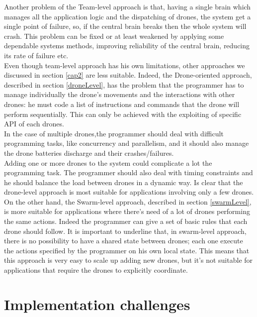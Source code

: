 Another problem of the Team-level approach is that, having a single brain which manages all the application logic and the dispatching of drones, the system get a single point of failure, so, if the central brain breaks then the whole system will crash.
This problem can be fixed or at least weakened by applying some dependable systems methods, improving reliability of the central brain, reducing its rate of failure etc.
\\

Even though team-level approach has his own limitations, other approaches we discussed in section \ref{cap2} are less suitable.
Indeed, the Drone-oriented approach, described in section \ref{droneLevel}, has the problem that the programmer has to manage individually the drone's movements and the interactions with other drones: he must code a list of instructions and commands that the drone will perform sequentially. This can only be achieved with the exploiting of specific API of each drones.
\\

In the case of multiple drones,the programmer should deal with difficult programming tasks, like concurrency and parallelism, and it should also manage the drone batteries discharge and their crashes/failures.
\\

Adding one or more drones to the system could complicate a lot the programming task. The programmer should also deal with timing constraints and he should balance the load between drones in a dynamic way.
Is clear that the drone-level approach is most suitable for applications involving only a few drones.
\\

On the other hand, the Swarm-level approach, described in section \ref{swarmLevel}, is more suitable for applications where there’s need of a lot of drones performing the same actions.
Indeed the programmer can give a set of basic rules that each drone should follow. It is important to underline that, in swarm-level approach, there is no possibility to have a shared state between drones; each one execute the actions specified by the programmer on his own local state. This means that this approach is very easy to scale up adding new drones, but it’s not suitable for applications that require the drones to explicitly coordinate.
\\

\section {Implementation challenges}\label{challenges}

